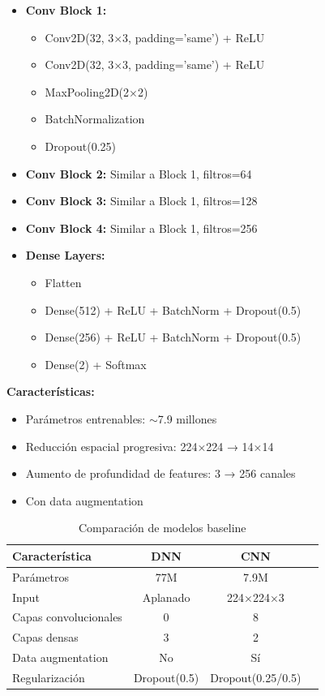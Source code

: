 \documentclass[11pt, a4paper]{article}
\begin{document}
\begin{itemize}
    \item \textbf{Conv Block 1:}
    \begin{itemize}
        \item Conv2D(32, 3$\times$3, padding='same') + ReLU
        \item Conv2D(32, 3$\times$3, padding='same') + ReLU
        \item MaxPooling2D(2$\times$2)
        \item BatchNormalization
        \item Dropout(0.25)
    \end{itemize}
    
    \item \textbf{Conv Block 2:} Similar a Block 1, filtros=64
    \item \textbf{Conv Block 3:} Similar a Block 1, filtros=128
    \item \textbf{Conv Block 4:} Similar a Block 1, filtros=256
    
    \item \textbf{Dense Layers:}
    \begin{itemize}
        \item Flatten
        \item Dense(512) + ReLU + BatchNorm + Dropout(0.5)
        \item Dense(256) + ReLU + BatchNorm + Dropout(0.5)
        \item Dense(2) + Softmax
    \end{itemize}
\end{itemize}

\textbf{Características:}
\begin{itemize}
    \item Parámetros entrenables: $\sim$7.9 millones
    \item Reducción espacial progresiva: 224×224 → 14×14
    \item Aumento de profundidad de features: 3 → 256 canales
    \item Con data augmentation
\end{itemize}

\begin{table}[H]
\centering
\caption{Comparación de modelos baseline}
\label{tab:baseline_comparison}
\begin{tabular}{@{}lccc@{}}
\toprule
\textbf{Característica} & \textbf{DNN} & \textbf{CNN} \\
\midrule
Parámetros            & 77M          & 7.9M \\
Input                 & Aplanado     & 224×224×3 \\
Capas convolucionales & 0            & 8 \\
Capas densas          & 3            & 2 \\
Data augmentation     & No           & Sí \\
Regularización        & Dropout(0.5) & Dropout(0.25/0.5) \\
\bottomrule
\end{tabular}
\end{table}
\end{document}
